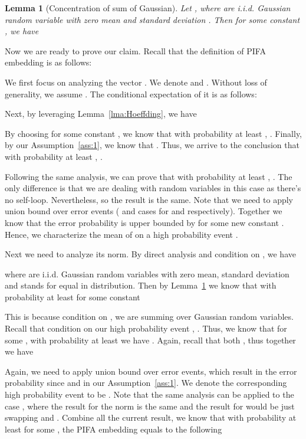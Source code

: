 \documentclass{article} \usepackage{iclr2022_conference,times}
\newtheorem{lemma}[theorem]{Lemma}
\begin{document}
\begin{lemma}	[Concentration of sum of Gaussian]\label{lma:gauss_concentration}
	Let , where  are i.i.d. Gaussian random variable with zero mean and standard deviation . Then for some constant , we have
	
\end{lemma}

Now we are ready to prove our claim. Recall that the definition of PIFA embedding  is as follows:

We first focus on analyzing the vector . We denote  and . Without loss of generality, we assume . The conditional expectation of it is as follows:

Next, by leveraging Lemma~\ref{lma:Hoeffding}, we have

By choosing  for some constant , we know that with probability at least , . Finally, by our Assumption~\ref{ass:1}, we know that . Thus, we arrive to the conclusion that with probability at least , .

Following the same analysis, we can prove that with probability at least , . The only difference is that we are dealing with  random variables in this case as there's no self-loop. Nevertheless,  so the result is the same. Note that we need to apply union bound over  error events ( and  cases for  and  respectively). Together we know that the error probability is upper bounded by  for some new constant . Hence, we characterize the mean of  on a high probability event .

Next we need to analyze its norm. By direct analysis and condition on , we have

where  are i.i.d. Gaussian random variables with zero mean,  standard deviation and  stands for equal in distribution. Then by Lemma~\ref{lma:gauss_concentration} we know that with probability at least  for some constant 

This is because condition on , we are summing over  Gaussian random variables. Recall that condition on our high probability event , . Thus, we know that for some , with probability at least  we have .  Again, recall that both , thus together we have

Again, we need to apply union bound over  error events, which result in the error probability  since  and  in our Assumption~\ref{ass:1}. We denote the corresponding high probability event to be . Note that the same analysis can be applied to the case , where the result for the norm is the same and the result for  would be just swapping  and . Combine all the current result, we know that with probability at least  for some , the PIFA embedding  equals to the following
\end{document}
